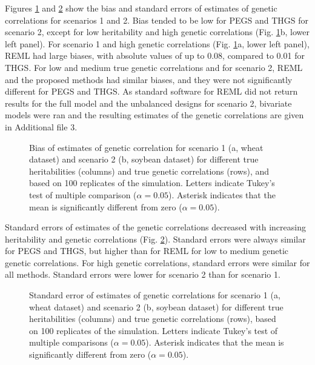 \documentclass{bmcart}
\def\texttt{[image: ]}
\begin{document}
Figures \ref{GCBIAS} and \ref{GCSE} show the bias and standard errors of estimates of genetic correlations for scenarios 1 and 2.  Bias tended to be low for PEGS and THGS for scenario 2, except for low heritability and high genetic correlations (Fig. \ref{GCBIAS}b, lower left panel). For scenario 1 and high genetic correlations (Fig. \ref{GCBIAS}a, lower left panel), REML had large biases, with absolute values of up to 0.08, compared to 0.01 for THGS. For low and medium true genetic correlations and for scenario 2, REML and the proposed methods had similar biases, and they were not significantly different for PEGS and THGS. As standard software for REML did not return results for the full model and the unbalanced designs for scenario 2, bivariate models were ran and the resulting estimates of the genetic correlations are given in Additional file 3.

\begin{figure}%
  \caption{\small{Bias of estimates of genetic correlation for scenario 1 (a, wheat dataset) and scenario 2 (b, soybean dataset) for different true heritabilities (columns) and true genetic correlations (rows), and based on 100 replicates of the simulation. Letters indicate Tukey's test of multiple comparison ($\alpha=0.05$). Asterisk indicates that the mean is significantly different from zero ($\alpha=0.05$).}}
  \label{GCBIAS}
\end{figure}

Standard errors of estimates of the genetic correlations decreased with increasing heritability and genetic correlations (Fig. \ref{GCSE}). Standard errors were always similar for PEGS and THGS, but higher than for REML for low to medium genetic genetic correlations. For high genetic correlations, standard errors were similar for all methods. Standard errors were lower for scenario 2 than for scenario 1.

\begin{figure}%
  \caption{\small{Standard error of estimates of genetic correlations for scenario 1 (a, wheat dataset) and scenario 2 (b, soybean dataset) for different true heritabilities (columns) and true genetic correlations (rows), based on 100 replicates of the simulation. Letters indicate Tukey's test of multiple comparisons ($\alpha=0.05$). Asterisk indicates that the mean is significantly different from zero ($\alpha=0.05$).}}
  \label{GCSE}
\end{figure}
\end{document}
